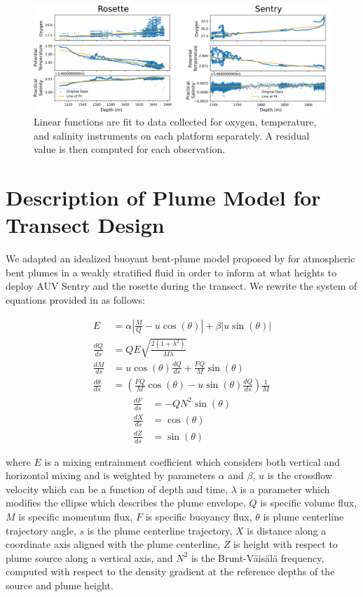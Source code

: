 \begin{figure}[h!]
    \centering
    \includegraphics[width=1\columnwidth]{figures/depth_correction_plots.png}
    \caption{Linear functions are fit to data collected for oxygen, temperature, and salinity instruments on each platform separately. A residual value is then computed for each observation.}
    \label{fig:linear_fits}
\end{figure}

\section{Description of Plume Model for Transect Design}
\label{app:perception:model}
We adapted an idealized buoyant bent-plume model proposed by \cite{tohidi2016highly} for atmospheric bent plumes in a weakly stratified fluid in order to inform at what heights to deploy AUV Sentry and the rosette during the transect. We rewrite the system of equations provided in \cite{tohidi2016highly} as follows:

\begin{align}
    E &= \alpha\left|\frac{M}{Q} - u\cos(\theta)\right| + \beta\left|u\sin(\theta)\right| \\
    \frac{dQ}{ds} &= QE\sqrt{\frac{2(1 + \lambda^2)}{M\lambda}} \\
    \frac{dM}{ds} &= u\cos(\theta)\frac{dQ}{ds} + \frac{FQ}{M}\sin(\theta)\\
    \frac{d\theta}{ds} &= \left(\frac{FQ}{M}\cos(\theta) - u\sin(\theta)\frac{dQ}{ds}\right)\frac{1}{M}
\end{align}
\begin{align}
    \frac{dF}{ds} &= -QN^2\sin(\theta)\\
    \frac{dX}{ds} &= \cos(\theta)\\
    \frac{dZ}{ds} &= \sin(\theta)
\end{align}

\noindent where $E$ is a mixing entrainment coefficient which considers both vertical and horizontal mixing and is weighted by parameters $\alpha$ and $\beta$, $u$ is the crossflow velocity which can be a function of depth and time, $\lambda$ is a parameter which modifies the ellipse which describes the plume envelope, $Q$ is specific volume flux, $M$ is specific momentum flux, $F$ is specific buoyancy flux, $\theta$ is plume centerline trajectory angle, $s$ is the plume centerline trajectory, $X$ is distance along a coordinate axis aligned with the plume centerline, $Z$ is height with respect to plume source along a vertical axis, and $N^2$ is the Brunt-V\"ais\"al\"a frequency, computed with respect to the density gradient at the reference depths of the source and plume height.

